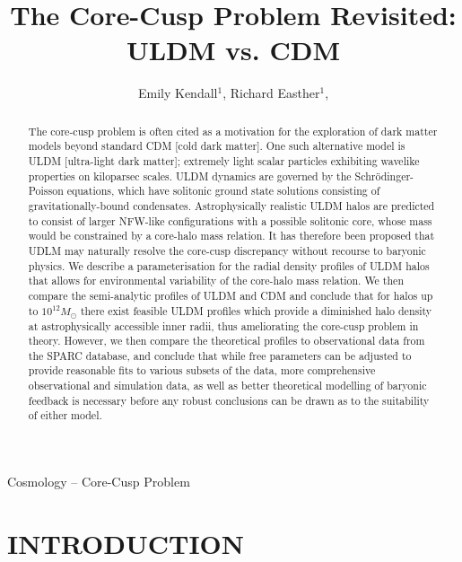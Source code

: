 \documentclass{pasa}%
\title[The Core-Cusp Problem Revisited: ULDM vs. CDM]{The Core-Cusp Problem Revisited: ULDM vs. CDM}
\author[Emily Kendall and Richard Easther]{Emily Kendall$^1$, Richard Easther$^1$, \affil{$^1$Department of Physics, University of Auckland, Private Bag 92019, Auckland, New Zealand}}%
\begin{document}
\begin{frontmatter}
\maketitle

\begin{abstract}
The core-cusp problem is often cited as a motivation for the exploration of dark matter models beyond standard CDM [cold dark matter]. One such alternative model is ULDM [ultra-light dark matter]; extremely light scalar particles exhibiting wavelike properties on kiloparsec scales. ULDM dynamics are governed by the Schr\"{o}dinger-Poisson equations, which have solitonic ground state solutions consisting of gravitationally-bound condensates. Astrophysically realistic ULDM halos are predicted to consist of larger NFW-like configurations with a possible solitonic core, whose mass would be constrained by a core-halo mass relation. It has therefore been proposed that UDLM may naturally resolve the core-cusp discrepancy without recourse to baryonic physics. We describe a parameterisation for the radial density profiles of ULDM halos that allows for environmental variability of the core-halo mass relation. We then compare the semi-analytic profiles of ULDM and CDM and conclude that for halos up to $10^{12} M_\odot$ there exist feasible ULDM profiles which provide a diminished halo density at astrophysically accessible inner radii, thus ameliorating the core-cusp problem in theory. However, we then compare the theoretical profiles to observational data from the SPARC database, and conclude that while free parameters can be adjusted to provide reasonable fits to various subsets of the data, more comprehensive observational and simulation data, as well as better theoretical modelling of baryonic feedback is necessary before any robust conclusions can be drawn as to the suitability of either model.  

\end{abstract}

\begin{keywords}
Cosmology -- Core-Cusp Problem 
\end{keywords}
\end{frontmatter}


\section{INTRODUCTION }
\label{sec:intro}
\end{document}

